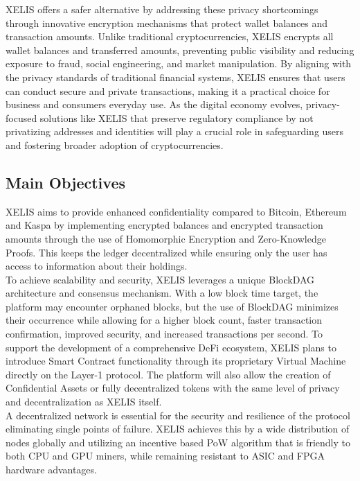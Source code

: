 \documentclass[10pt,a4paper,twocolumn]{article}
\begin{document}
XELIS offers a safer alternative by addressing these privacy shortcomings through innovative encryption mechanisms that protect wallet balances and transaction amounts. Unlike traditional cryptocurrencies, XELIS encrypts all wallet balances and transferred amounts, preventing public visibility and reducing exposure to fraud, social engineering, and market manipulation. By aligning with the privacy standards of traditional financial systems, XELIS ensures that users can conduct secure and private transactions, making it a practical choice for business and consumers everyday use. As the digital economy evolves, privacy-focused solutions like XELIS that preserve regulatory compliance by not privatizing addresses and identities will play a crucial role in safeguarding users and fostering broader adoption of cryptocurrencies.

\subsection{Main Objectives}

XELIS aims to provide enhanced confidentiality compared to Bitcoin, Ethereum and Kaspa by implementing encrypted balances and encrypted transaction amounts through the use of Homomorphic Encryption and Zero-Knowledge Proofs. This keeps the ledger decentralized while ensuring only the user has access to information about their holdings.\\

To achieve scalability and security, XELIS leverages a unique BlockDAG architecture and consensus mechanism. With a low block time target, the platform may encounter orphaned blocks, but the use of BlockDAG minimizes their occurrence while allowing for a higher block count, faster transaction confirmation, improved security, and increased transactions per second. To support the development of a comprehensive DeFi ecosystem, XELIS plans to introduce Smart Contract functionality through its proprietary Virtual Machine directly on the Layer-1 protocol. The platform will also allow the creation of Confidential Assets or fully decentralized tokens with the same level of privacy and decentralization as XELIS itself.\\

A decentralized network is essential for the security and resilience of the protocol eliminating single points of failure. XELIS achieves this by a wide distribution of nodes globally and utilizing an incentive based PoW algorithm that is friendly to both CPU and GPU miners, while remaining resistant to ASIC and FPGA hardware advantages.\\
\end{document}
